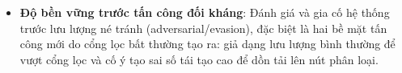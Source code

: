 \begin{itemize}
    \item \textbf{Độ bền vững trước tấn công đối kháng}: Đánh giá và gia cố hệ thống trước lưu lượng né tránh (adversarial/evasion), đặc biệt là hai bề mặt tấn công mới do cổng lọc bất thường tạo ra: giả dạng lưu lượng bình thường để vượt cổng lọc và cố ý tạo sai số tái tạo cao để dồn tải lên nút phân loại.
\end{itemize}